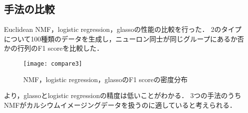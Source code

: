 \subsection{手法の比較}
Euclidean NMF，logistic regression，glassoの性能の比較を行った．
2のタイプについて100種類のデータを生成し，ニューロン同士が同じグループにあるか否かの行列のF1 scoreを比較した．
\begin{figure}[htbp]
    \begin{center}
        \texttt{[image: compare3]}
        \caption{NMF，logistic regression，glassoのF1 scoreの密度分布}
        \label{fig:compare3}
    \end{center}
\end{figure}
より，glassoとlogistic regressionの精度は低いことがわかる．
3つの手法のうちNMFがカルシウムイメージングデータを扱うのに適していると考えられる．

